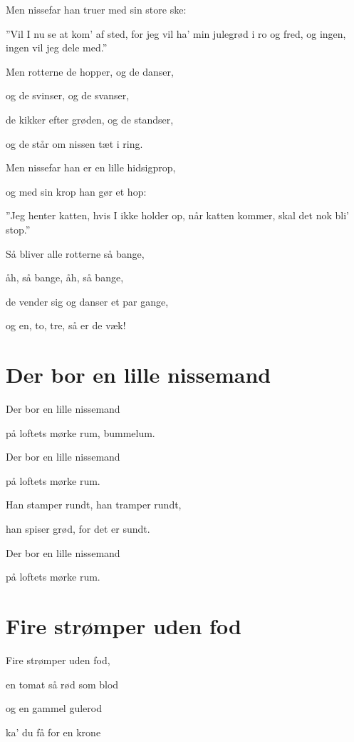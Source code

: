 \documentclass[11pt]{beamer}
\begin{document}
\begin{frame}
Men nissefar han truer med sin store ske:

''Vil I nu se at kom' af sted,
for jeg vil ha' min julegrød i ro og fred,
og ingen, ingen vil jeg dele med.''

Men rotterne de hopper, og de danser,

og de svinser, og de svanser,

de kikker efter grøden, og de standser,

og de står om nissen tæt i ring.
\end{frame}

\begin{frame}
Men nissefar han er en lille hidsigprop,

og med sin krop han gør et hop:

''Jeg henter katten, hvis I ikke holder op,
når katten kommer, skal det nok bli' stop.''

Så bliver alle rotterne så bange,

åh, så bange, åh, så bange,

de vender sig og danser et par gange,

og en, to, tre, så er de væk! 
\end{frame}

\toc

\section{Der bor en lille nissemand}
\begin{frame}
Der bor en lille nissemand

på loftets mørke rum, bummelum.

Der bor en lille nissemand

på loftets mørke rum.

Han stamper rundt, han tramper rundt,

han spiser grød, for det er sundt.

Der bor en lille nissemand

på loftets mørke rum.
\end{frame}

\toc

\section{Fire strømper uden fod}
\begin{frame}
Fire strømper uden fod,

en tomat så rød som blod

og en gammel gulerod

ka’ du få for en krone
\end{frame}
\end{document}
